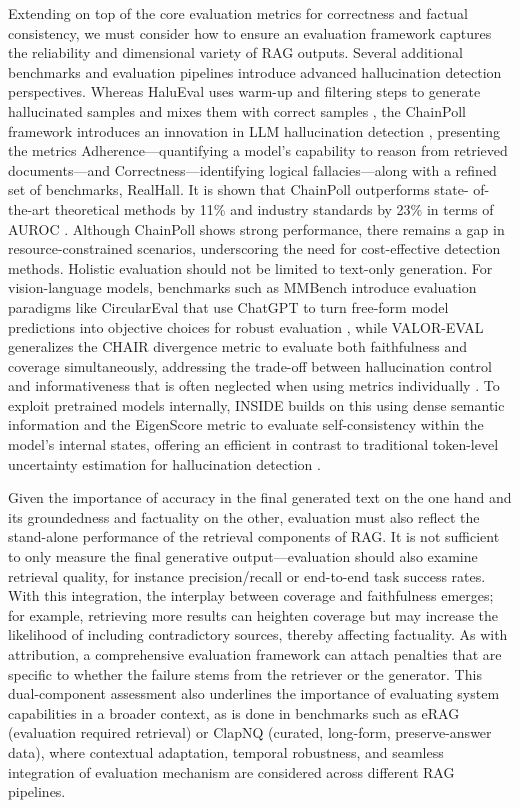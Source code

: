 \documentclass[11pt]{article}
\begin{document}
Extending on top of the core evaluation metrics for correctness and factual consistency, we must consider how to ensure an evaluation framework captures the reliability and dimensional variety of RAG outputs. Several additional benchmarks and evaluation pipelines introduce advanced hallucination detection perspectives. Whereas HaluEval uses warm-up and filtering steps to generate hallucinated samples and mixes them with correct samples \cite{ref123}, the ChainPoll framework introduces an innovation in LLM hallucination detection \cite{ref131}, presenting the metrics Adherence---quantifying a model's capability to reason from retrieved documents---and Correctness---identifying logical fallacies---along with a refined set of benchmarks, RealHall. It is shown that ChainPoll outperforms state- of-the-art theoretical methods by 11\% and industry standards by 23\% in terms of AUROC \cite{ref131}. Although ChainPoll shows strong performance, there remains a gap in resource-constrained scenarios, underscoring the need for cost-effective detection methods. Holistic evaluation should not be limited to text-only generation. For vision-language models, benchmarks such as MMBench introduce evaluation paradigms like CircularEval that use ChatGPT to turn free-form model predictions into objective choices for robust evaluation \cite{ref132}, while VALOR-EVAL generalizes the CHAIR divergence metric to evaluate both faithfulness and coverage simultaneously, addressing the trade-off between hallucination control and informativeness that is often neglected when using metrics individually \cite{ref133}. To exploit pretrained models internally, INSIDE builds on this using dense semantic information and the EigenScore metric to evaluate self-consistency within the model's internal states, offering an efficient in contrast to traditional token-level uncertainty estimation for hallucination detection \cite{ref134}.

Given the importance of accuracy in the final generated text on the one hand and its groundedness and factuality on the other, evaluation must also reflect the stand-alone performance of the retrieval components of RAG. It is not sufficient to only measure the final generative output---evaluation should also examine retrieval quality, for instance precision/recall or end-to-end task success rates. With this integration, the interplay between coverage and faithfulness emerges; for example, retrieving more results can heighten coverage but may increase the likelihood of including contradictory sources, thereby affecting factuality. As with attribution, a comprehensive evaluation framework can attach penalties that are specific to whether the failure stems from the retriever or the generator. This dual-component assessment also underlines the importance of evaluating system capabilities in a broader context, as is done in benchmarks such as eRAG (evaluation required retrieval) or ClapNQ (curated, long-form, preserve-answer data), where contextual adaptation, temporal robustness, and seamless integration of evaluation mechanism are considered across different RAG pipelines.
\end{document}

